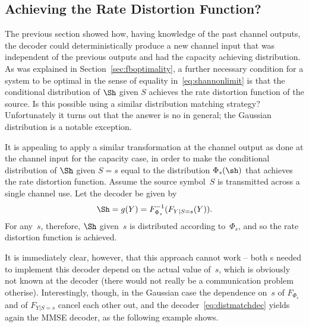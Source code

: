 \subsection{Achieving the Rate Distortion Function?}

The previous section showed how, having knowledge of the past channel outputs,
the decoder could deterministically produce a new channel input that was
independent of the previous outputs and had the capacity achieving distribution.
As was explained in Section~\ref{sec:fboptimality}, a further necessary
condition for a system to be optimal in the sense of equality
in~\eqref{eq:shannonlimit} is
that the conditional distribution of $\Sh$ given $S$ achieves the rate
distortion function of the source. Is this possible using a similar distribution
matching strategy?  Unfortunately it turns out that the answer is no in general;
the Gaussian distribution is a notable exception.

It is appealing to apply a similar transformation at the channel output as done
at the channel input for the capacity case, in order to make the conditional
distribution of $\Sh$ given $S=s$ equal to the distribution
$\Phi_s(\sh)$ that achieves the rate distortion function. Assume the source
symbol~$S$ is transmitted across a single channel use. Let the decoder be given
by
\begin{equation}
  \label{eq:distmatchdec}
  \Sh = g(Y) = F_{\Phi_s}^{-1}(F_{Y|S=s}(Y)).
\end{equation}
For any~$s$, therefore, $\Sh$ given~$s$ is distributed according to~$\Phi_s$,
and so the rate distortion function is achieved.

It is immediately clear, however, that this approach cannot work -- both \cdf s
needed to implement this decoder depend on the actual value of~$s$, which is
obviously not known at the decoder (there would not really be a communication
problem otherise). Interestingly, though, in the Gaussian case the dependence
on~$s$ of $F_{\Phi_s}$ and of $F_{Y|S=s}$ cancel each other out, and the
decoder~\eqref{eq:distmatchdec} yields again the MMSE decoder, as the following
example shows.

